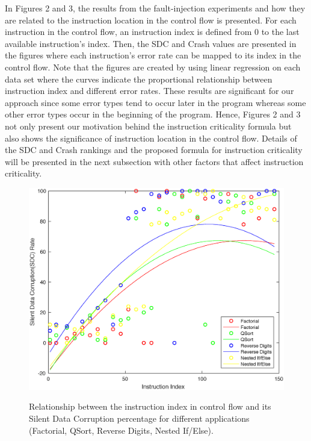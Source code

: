 In Figures 2 and 3, the results from the fault-injection experiments and how they are related to the instruction location in the control flow is presented. For each instruction in the control flow, an instruction index is defined from 0 to the last available instruction's index. Then, the SDC and Crash values are presented in the figures where each instruction's error rate can be mapped to its index in the control flow. Note that the figures are created by using linear regression on each data set where the curves indicate the proportional relationship between instruction index and different error rates. These results are significant for our approach since some error types tend to occur later in the program whereas some other error types occur in the beginning of the program. Hence, Figures 2 and 3 not only present our motivation behind the instruction criticality formula but also shows the significance of instruction location in the control flow. Details of the SDC and Crash rankings and the proposed formula for instruction criticality will be presented in the next subsection with other factors that affect instruction criticality. 

\begin{figure}[!t]
\begin{center}
\label{fig:plan_8}\includegraphics[scale=0.3]{./figures/figure_2_22.eps}
\end{center}
\caption{Relationship between the instruction index in control flow and its Silent Data Corruption percentage for different applications (Factorial, QSort, Reverse Digits, Nested If/Else).}
\label{fig:plan_8}
\end{figure}

